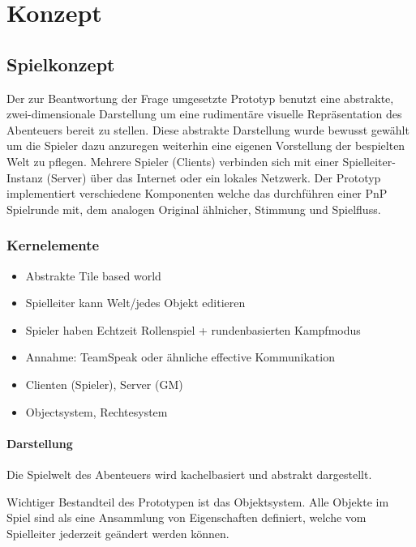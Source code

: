 \chapter{Konzept}
\label{concept}


\section{Spielkonzept}
\label{sec:Grobkonzept}
Der zur Beantwortung der Frage umgesetzte Prototyp benutzt eine abstrakte, zwei-dimensionale Darstellung um eine rudimentäre visuelle Repräsentation des Abenteuers bereit zu stellen. Diese abstrakte Darstellung wurde bewusst gewählt um die Spieler dazu anzuregen weiterhin eine eigenen Vorstellung der bespielten Welt zu pflegen. Mehrere Spieler (Clients) verbinden sich mit einer Spielleiter-Instanz (Server) über das Internet  oder ein lokales Netzwerk. Der Prototyp implementiert verschiedene Komponenten welche das durchführen einer PnP Spielrunde mit, dem analogen Original ählnicher, Stimmung und Spielfluss.



\subsection{Kernelemente}

\begin{itemize}
	\item Abstrakte Tile based world
	\item Spielleiter kann Welt/jedes Objekt editieren
	\item Spieler haben Echtzeit Rollenspiel + rundenbasierten Kampfmodus
	\item Annahme: TeamSpeak oder ähnliche effective Kommunikation
	\item Clienten (Spieler),  Server (GM)
	\item Objectsystem, Rechtesystem
\end{itemize}

\subsubsection{Darstellung}
\label{sec:Darstellung}

 
Die Spielwelt des Abenteuers wird kachelbasiert und abstrakt dargestellt. 

Wichtiger Bestandteil des Prototypen ist das Objektsystem. Alle Objekte im Spiel sind als eine Ansammlung von Eigenschaften definiert, welche vom Spielleiter jederzeit geändert werden können.


